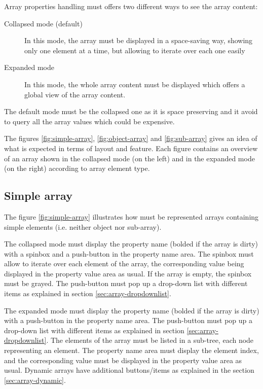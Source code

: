 \documentclass[a4paper, twoside]{report}
\begin{document}
Array properties handling must offers two different ways to see the array content:
\begin{description}
    \item[Collapsed mode (default)] In this mode, the array must be displayed in a space-saving way,
showing only one element at a time, but allowing to iterate over each one easily
    \item[Expanded mode] In this mode, the whole array content must be displayed which offers a
global view of the array content.
\end{description}

The default mode must be the collapsed one as it is space preserving and it avoid to query all the
array values which could be expensive.

The figures \ref{fig:simple-array}, \ref{fig:object-array} and \ref{fig:sub-array} gives an idea of
what is expected in terms of layout and feature. Each figure contains an overview of an array shown
in the collapsed mode (on the left) and in the expanded mode (on the right) according to array
element type.

\subsection{Simple array\label{sec:array-simple}}

The figure \ref{fig:simple-array} illustrates how must be represented arrays containing simple
elements (i.e. neither object nor sub-array).

The collapsed mode must display the property name (bolded if the array is dirty) with a spinbox and
a push-button in the property name area. The spinbox must allow to iterate
over each element of the array, the corresponding value being displayed in the property value area
as usual. If the array is empty, the spinbox must be grayed. The push-button must pop up a
drop-down list with different items as explained in section \ref{sec:array-dropdownlist}.

The expanded mode must display the property name (bolded if the array is dirty) with a push-button
in the property name area. The push-button must pop up a drop-down list with different items as
explained in section \ref{sec:array-dropdownlist}. The elements of the array must be listed in a
sub-tree, each node representing an element. The property name area must display the element
index, and the corresponding value must be displayed in the property value area as usual. Dynamic
arrays have additional buttons/items as explained in the section \ref{sec:array-dynamic}.
\end{document}
